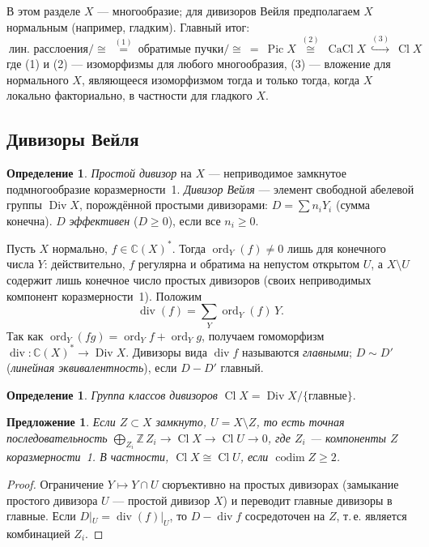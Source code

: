 \documentclass[11pt,a4paper]{article}
\theoremstyle{plain}
\newtheorem{proposition}[theorem]{Предложение}
\theoremstyle{definition}
\newtheorem{definition}[theorem]{Определение}
\theoremstyle{remark}
\renewcommand{\C}{\mathbb{C}}
\newcommand{\Z}{\mathbb{Z}}
\DeclareMathOperator{\Pic}{Pic}
\DeclareMathOperator{\Cl}{Cl}
\DeclareMathOperator{\Div}{Div}
\DeclareMathOperator{\CaCl}{CaCl}
\DeclareMathOperator{\divv}{div}
\DeclareMathOperator{\ord}{ord}
\DeclareMathOperator{\codim}{codim}
\begin{document}
В этом разделе $X$ --- многообразие; для дивизоров Вейля предполагаем $X$ нормальным
(например, гладким). Главный итог:
\[
\boxed{\ \text{лин. расслоения}/{\cong}\ \overset{(1)}{=}\ \text{обратимые пучки}/{\cong}\ =\ \Pic X
\ \overset{(2)}{\cong}\ \CaCl X\ \overset{(3)}{\hookrightarrow}\ \Cl X\ }
\]
где (1) и (2) --- изоморфизмы для любого многообразия, (3) --- вложение для нормального $X$,
являющееся изоморфизмом тогда и только тогда, когда $X$ локально факториально, в частности для
гладкого $X$.

\subsection{Дивизоры Вейля}

\begin{definition}
\emph{Простой дивизор} на $X$ --- неприводимое замкнутое подмногообразие коразмерности~1.
\emph{Дивизор Вейля} --- элемент свободной абелевой группы $\Div X$, порождённой простыми
дивизорами: $D=\sum n_iY_i$ (сумма конечна). $D$ \emph{эффективен} ($D\ge0$), если все $n_i\ge0$.
\end{definition}

Пусть $X$ нормально, $f\in\C(X)^*$. Тогда $\ord_Y(f)\ne0$ лишь для конечного числа $Y$:
действительно, $f$ регулярна и обратима на непустом открытом $U$, а $X\setminus U$ содержит лишь
конечное число простых дивизоров (своих неприводимых компонент коразмерности~1). Положим
\[
\divv(f)=\sum_Y\ord_Y(f)\,Y.
\]
Так как $\ord_Y(fg)=\ord_Y f+\ord_Y g$, получаем гомоморфизм $\divv\colon\C(X)^*\to\Div X$.
Дивизоры вида $\divv f$ называются \emph{главными}; $D\sim D'$ (\emph{линейная эквивалентность}),
если $D-D'$ главный.

\begin{definition}
\emph{Группа классов дивизоров} $\Cl X=\Div X/\{\text{главные}\}$.
\end{definition}

\begin{proposition}\label{prop:excision}
Если $Z\subset X$ замкнуто, $U=X\setminus Z$, то есть точная последовательность
$\bigoplus_{Z_i}\Z\, Z_i\to\Cl X\to\Cl U\to0$, где $Z_i$ --- компоненты $Z$ коразмерности~1.
В частности, $\Cl X\cong\Cl U$, если $\codim Z\ge2$.
\end{proposition}
\begin{proof}
Ограничение $Y\mapsto Y\cap U$ сюръективно на простых дивизорах (замыкание простого дивизора $U$
--- простой дивизор $X$) и переводит главные дивизоры в главные. Если $D|_U=\divv(f)|_U$, то
$D-\divv f$ сосредоточен на $Z$, т.\,е. является комбинацией $Z_i$.
\end{proof}
\end{document}
